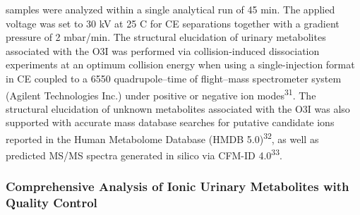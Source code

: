 \documentclass[journal=jacsat,manuscript=article]{achemso}
\begin{document}
samples were analyzed within a single analytical run of 45 min. The
applied voltage was set to 30 kV at 25 C for CE separations together
with a gradient pressure of 2 mbar/min. The structural elucidation of
urinary metabolites associated with the O3I was performed via
collision-induced dissociation experiments at an optimum collision
energy when using a single-injection format in CE coupled to a 6550
quadrupole--time of flight--mass spectrometer system (Agilent
Technologies Inc.) under positive or negative ion
modes\textsuperscript{31}. The structural elucidation of unknown
metabolites associated with the O3I was also supported with accurate
mass database searches for putative candidate ions reported in the Human
Metabolome Database (HMDB 5.0)\textsuperscript{32}, as well as predicted
MS/MS spectra generated in silico via CFM-ID 4.0\textsuperscript{33}.

\subsubsection{Comprehensive Analysis of Ionic Urinary Metabolites with
Quality
Control}\label{comprehensive-analysis-of-ionic-urinary-metabolites-with-quality-control}
\end{document}
